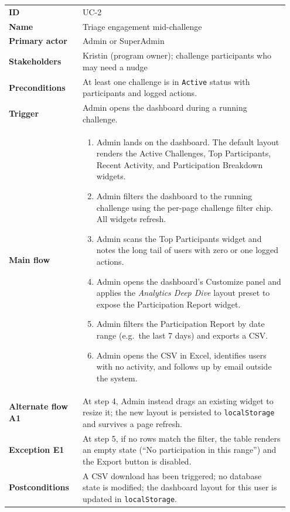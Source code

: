 \documentclass[11pt,letterpaper]{article}
\begin{document}
\begin{longtable}{p{0.25\linewidth} p{0.7\linewidth}}
\toprule
\textbf{ID}         & UC-2 \\
\textbf{Name}       & Triage engagement mid-challenge \\
\textbf{Primary actor} & Admin or SuperAdmin \\
\textbf{Stakeholders} & Kristin (program owner); challenge participants
who may need a nudge \\
\textbf{Preconditions} & At least one challenge is in \texttt{Active}
status with participants and logged actions. \\
\textbf{Trigger}    & Admin opens the dashboard during a running
challenge. \\
\midrule
\textbf{Main flow} & \begin{enumerate}[noitemsep,leftmargin=*]
  \item Admin lands on the dashboard. The default layout renders the
        Active Challenges, Top Participants, Recent Activity, and
        Participation Breakdown widgets.
  \item Admin filters the dashboard to the running challenge using the
        per-page challenge filter chip. All widgets refresh.
  \item Admin scans the Top Participants widget and notes the long
        tail of users with zero or one logged actions.
  \item Admin opens the dashboard's Customize panel and applies the
        \textit{Analytics Deep Dive} layout preset to expose the
        Participation Report widget.
  \item Admin filters the Participation Report by date range (e.g.\
        the last 7 days) and exports a CSV.
  \item Admin opens the CSV in Excel, identifies users with no
        activity, and follows up by email outside the system.
\end{enumerate} \\
\midrule
\textbf{Alternate flow A1} & At step 4, Admin instead drags an
existing widget to resize it; the new layout is persisted to
\texttt{localStorage} and survives a page refresh. \\
\textbf{Exception E1} & At step 5, if no rows match the filter, the
table renders an empty state (``No participation in this range'') and
the Export button is disabled. \\
\textbf{Postconditions} & A CSV download has been triggered; no
database state is modified; the dashboard layout for this user is
updated in \texttt{localStorage}. \\
\bottomrule
\end{longtable}
\end{document}
